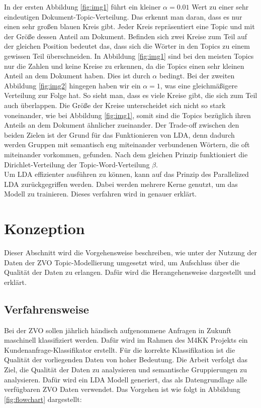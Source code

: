 \documentclass[german,version-2020-11]{uzl-thesis}
\begin{document}
In der ersten Abbildung \ref{fig:img1} führt ein kleiner $\alpha = 0.01$ Wert zu einer sehr eindeutigen Dokument-Topic-Verteilung. Das erkennt man daran, dass es nur einen sehr großen blauen Kreis gibt. Jeder Kreis repräsentiert eine Topic und mit der Größe dessen Anteil am Dokument. Befinden sich zwei Kreise zum Teil auf der gleichen Position bedeutet das, dass sich die Wörter in den Topics zu einem gewissen Teil überschneiden. In Abbildung \ref{fig:img1} sind bei den meisten Topics nur die Zahlen und keine Kreise zu erkennen, da die Topics einen sehr kleinen Anteil an dem Dokument haben. Dies ist durch $\alpha$ bedingt. Bei der zweiten Abbildung \ref{fig:img2} hingegen haben wir ein $\alpha = 1$, was eine gleichmäßigere Verteilung zur Folge hat. So sieht man, dass es viele Kreise gibt, die sich zum Teil auch überlappen. Die Größe der Kreise unterscheidet sich nicht so stark voneinander, wie bei Abbildung \ref{fig:img1}, somit sind die Topics bezüglich ihren Anteils an dem Dokument ähnlicher zueinander. Der Trade-off zwischen den beiden Zielen ist der Grund für das Funktionieren von LDA, denn dadurch werden Gruppen mit semantisch eng miteinander verbundenen Wörtern, die oft miteinander vorkommen, gefunden. Nach dem gleichen Prinzip funktioniert die Dirichlet-Verteilung der Topic-Word-Verteilung $\beta$. \\

Um LDA effizienter ausführen zu können, kann auf das Prinzip des Parallelized LDA zurückgegriffen werden. Dabei werden mehrere Kerne genutzt, um das Modell zu trainieren. Dieses verfahren wird in \cite{radim2} genauer erklärt.


\chapter{Konzeption} %

Dieser Abschnitt wird die Vorgehensweise beschreiben, wie unter der Nutzung der Daten der ZVO Topic-Modellierung umgesetzt wird, um Aufschluss über die Qualität der Daten zu erlangen. Dafür wird die Herangehensweise dargestellt und erklärt.

\section{Verfahrensweise}
Bei der ZVO sollen jährlich händisch aufgenommene Anfragen in Zukunft maschinell klassifiziert werden. Dafür wird im Rahmen des M4KK Projekts ein Kundenanfrage-Klassifikator erstellt. Für die korrekte Klassifikation ist die Qualität der vorliegenden Daten von hoher Bedeutung. Die Arbeit verfolgt das Ziel, die Qualität der Daten zu analysieren und semantische Gruppierungen zu analysieren. Dafür wird ein LDA Modell generiert, das als Datengrundlage alle verfügbaren ZVO Daten verwendet. Das Vorgehen ist wie folgt in Abbildung \ref{fig:flowchart} dargestellt:   
\end{document}
